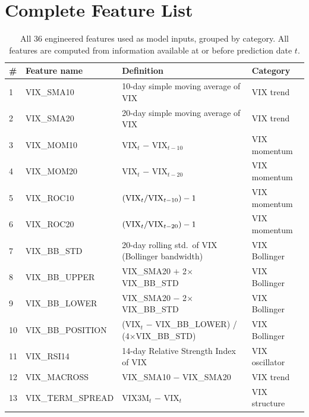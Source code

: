 \documentclass[11pt]{article}
\begin{document}
\appendix
\section{Complete Feature List}
\label{app:features}

\begin{table}[H]
\centering
\caption{All 36 engineered features used as model inputs, grouped by category. All features are computed from information available at or before prediction date $t$.}
\label{tab:features}
\small
\begin{tabular}{llll}
\toprule
\# & Feature name & Definition & Category \\
\midrule
1  & VIX\_SMA10        & 10-day simple moving average of VIX                        & VIX trend \\
2  & VIX\_SMA20        & 20-day simple moving average of VIX                        & VIX trend \\
3  & VIX\_MOM10        & VIX$_t$ $-$ VIX$_{t-10}$                                  & VIX momentum \\
4  & VIX\_MOM20        & VIX$_t$ $-$ VIX$_{t-20}$                                  & VIX momentum \\
5  & VIX\_ROC10        & $({\rm VIX}_t / {\rm VIX}_{t-10}) - 1$                     & VIX momentum \\
6  & VIX\_ROC20        & $({\rm VIX}_t / {\rm VIX}_{t-20}) - 1$                     & VIX momentum \\
7  & VIX\_BB\_STD      & 20-day rolling std.\ of VIX (Bollinger bandwidth)          & VIX Bollinger \\
8  & VIX\_BB\_UPPER    & VIX\_SMA20 $+$ 2$\times$VIX\_BB\_STD                       & VIX Bollinger \\
9  & VIX\_BB\_LOWER    & VIX\_SMA20 $-$ 2$\times$VIX\_BB\_STD                       & VIX Bollinger \\
10 & VIX\_BB\_POSITION & (VIX$_t$ $-$ VIX\_BB\_LOWER) / (4$\times$VIX\_BB\_STD)    & VIX Bollinger \\
11 & VIX\_RSI14        & 14-day Relative Strength Index of VIX                      & VIX oscillator \\
12 & VIX\_MACROSS      & VIX\_SMA10 $-$ VIX\_SMA20                                  & VIX trend \\
13 & VIX\_TERM\_SPREAD & VIX3M$_t$ $-$ VIX$_t$                                      & VIX structure \\

\end{tabular}
\end{table}
\end{document}
